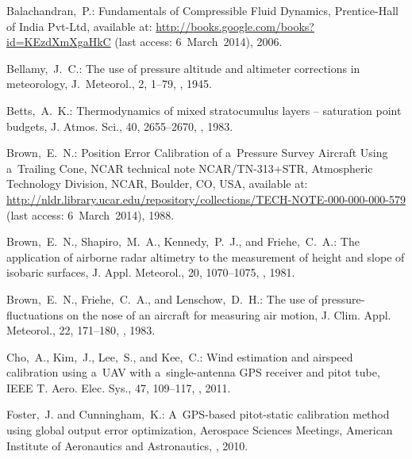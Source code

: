 \documentclass[amtd, online, hvmath]{copernicus}
\begin{document}
\begin{thebibliography}{30}

Balachandran,~P.: {Fundamentals of Compressible Fluid Dynamics},
Prentice-Hall of India Pvt-Ltd, available at: \url{http://books.google.com/books?id=KEzdXmXgaHkC} (last access: 6~March~2014), 2006.


Bellamy,~J.~C.: {The use of pressure altitude and altimeter corrections in meteorology},
{J.~Meteorol.}, 2, 1--79, , 1945.


Betts,~A.~K.: {Thermodynamics of mixed stratocumulus layers -- saturation point budgets},
{J. Atmos. Sci.}, {40}, {2655--2670}, , {1983}.


Brown,~E.~N.: Position Error Calibration of a~Pressure Survey Aircraft
Using a~Trailing Cone, NCAR technical note NCAR/TN-313+STR,
Atmospheric Technology Division, NCAR, Boulder, CO, USA, available at:
\url{http://nldr.library.ucar.edu/repository/collections/TECH-NOTE-000-000-000-579} (last access: 6~March~2014), 1988.


Brown,~E.~N., Shapiro,~M.~A., Kennedy,~P.~J., and Friehe,~C.~A.: {The application
of airborne radar altimetry to the measurement of height and slope of isobaric surfaces},
{J. Appl. Meteorol.}, {20}, {1070--1075}, , {1981}.


Brown,~E.~N., Friehe,~C.~A., and Lenschow,~D.~H.: {The use of pressure-fluctuations
on the nose of an aircraft for measuring air motion}, {J. Clim. Appl. Meteorol.},
{22}, {171--180}, , {1983}.


Cho,~A., Kim,~J., Lee,~S., and Kee,~C.: {Wind estimation and airspeed calibration
using a~UAV with a~single-antenna GPS receiver and pitot tube}, {IEEE T. Aero. Elec. Sys.}, {47}, {109--117}, , {2011}.


Foster,~J. and Cunningham,~K.: {A~GPS-based pitot-static calibration
  method using global output error optimization}, {Aerospace Sciences
  Meetings}, American Institute of Aeronautics and Astronautics,
, 2010.



\end{thebibliography}
\end{document}
